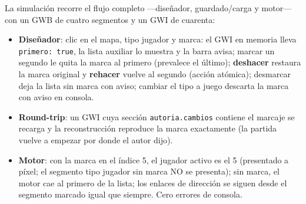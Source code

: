 La simulación recorre el flujo completo ---diseñador, guardado/carga y motor--- con un
GWB de cuatro segmentos y un GWI de cuarenta:

\begin{itemize}
	\item \textbf{Diseñador}: clic en el mapa, tipo jugador y marca: el GWI en memoria
	lleva \texttt{primero: true}, la lista auxiliar lo muestra y la barra avisa; marcar un
	segundo le quita la marca al primero (prevalece el último); \textbf{deshacer} restaura
	la marca original y \textbf{rehacer} vuelve al segundo (acción atómica); desmarcar deja
	la lista sin marca con aviso; cambiar el tipo a juego descarta la marca con aviso en
	consola.
	\item \textbf{Round-trip}: un GWI cuya sección \texttt{autoria.cambios} contiene el
	marcaje se recarga y la reconstrucción reproduce la marca exactamente (la partida
	vuelve a empezar por donde el autor dijo).
	\item \textbf{Motor}: con la marca en el índice 5, el jugador activo es el 5
	(presentado a píxel; el segmento tipo jugador sin marca NO se presenta); sin marca,
	el motor cae al primero de la lista; los enlaces de dirección se siguen desde el
	segmento marcado igual que siempre. Cero errores de consola.
\end{itemize}

